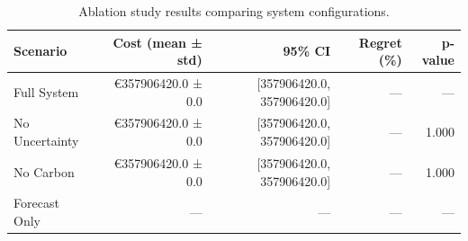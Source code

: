\begin{table}
\caption{Ablation study results comparing system configurations.}
\label{tab:ablation}
\begin{tabular}{lrrrr}
\toprule
Scenario & Cost (mean ± std) & 95\% CI & Regret (\%) & p-value \\
\midrule
Full System & €357906420.0 ± 0.0 & [357906420.0, 357906420.0] & — & — \\
No Uncertainty & €357906420.0 ± 0.0 & [357906420.0, 357906420.0] & — & 1.000 \\
No Carbon & €357906420.0 ± 0.0 & [357906420.0, 357906420.0] & — & 1.000 \\
Forecast Only & — & — & — & — \\
\bottomrule
\end{tabular}
\end{table}
